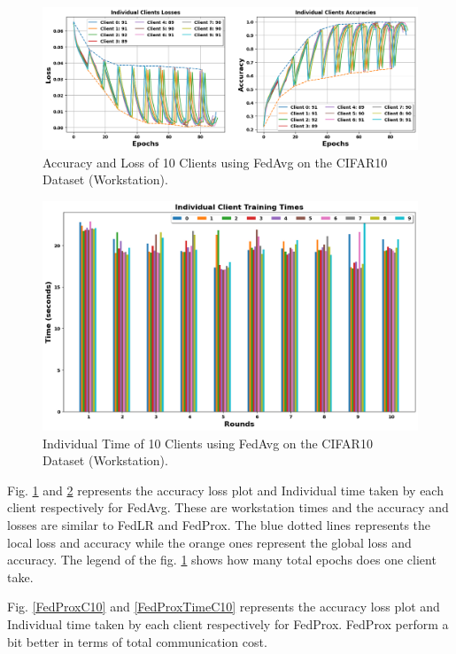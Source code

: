 \documentclass[conference]{IEEEtran}
\begin{document}
\begin{figure}[htp!]
	\centering
	\includegraphics[scale=.28]{Images/NEWGRAPHS/1.png }
	\caption{Accuracy and Loss of 10 Clients using FedAvg on the CIFAR10 Dataset (Workstation).}
	\label{FedAvgC10}
\end{figure}

\begin{figure}[htp!]
	\centering
	\includegraphics[scale=.3]{Images/NEWGRAPHS/2.png }
	\caption{Individual Time of 10 Clients using FedAvg on the CIFAR10 Dataset (Workstation).}
	\label{FedAvgTimeC10}
\end{figure}

Fig. \ref{FedAvgC10} and \ref{FedAvgTimeC10} represents the accuracy loss plot and Individual time taken by each client respectively for FedAvg.  These are workstation times and the accuracy and losses are similar to FedLR and FedProx. The blue dotted lines represents the local loss and accuracy while the orange ones represent the global loss and accuracy. The legend of the fig. \ref{FedAvgC10} shows how many total epochs does one client take.

Fig. \ref{FedProxC10} and \ref{FedProxTimeC10}  represents the accuracy loss plot and Individual time taken by each client respectively for FedProx. FedProx perform a bit better in terms of total communication cost.
%
\end{document}
